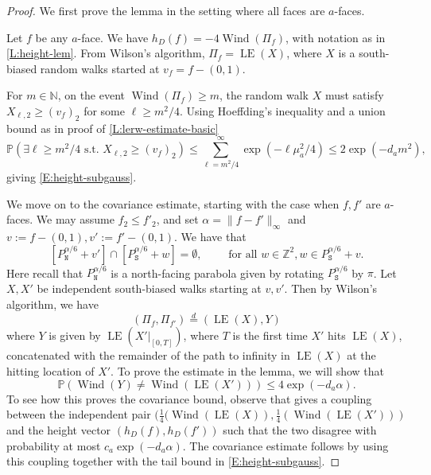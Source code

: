 \documentclass[11pt,twoside]{amsart}
\theoremstyle{plain}
\numberwithin{quest}{section}
\theoremstyle{remark}
\numberwithin{rem}{section}
\theoremstyle{definition}
\newcommand{\Z}{\mathbb{Z}}
\newcommand{\N}{\mathbb{N}}
\renewcommand{\P}{\mathbb{P}}
\renewcommand{\tt}[1]{{\mathtt{#1}}}
\begin{document}
	\begin{proof}
		We first prove the lemma in the setting where all faces are $a$-faces.
		
		Let $f$ be any $a$-face. We have $h_D(f) = - 4 \operatorname{Wind}(\Pi_f)$, with notation as in \cref{L:height-lem}. From Wilson's algorithm, $\Pi_f = \operatorname{LE}(X)$, where $X$ is a south-biased random walks started at $v_f = f - (0, 1)$.
		
		For $m \in \N$, on the event $\operatorname{Wind}(\Pi_f) \ge m$, the random walk $X$ must satisfy $X_{\ell, 2} \ge (v_f)_2$ for some $\ell \ge m^2/4$. Using Hoeffding's inequality and a union bound as in proof of \cref{L:lerw-estimate-basic}
		$$
		\P(\exists \ell \ge m^2/4 \text{ s.t. } X_{\ell, 2} \ge (v_f)_2) \le \sum_{\ell = m^2/4}^\infty \exp(-\ell \mu_a^2/4) \le 2 \exp(- d_a m^2),
		$$ 
		giving \eqref{E:height-subgauss}.
		
		We move on to the covariance estimate, starting with the case when $f, f'$ are $a$-faces. We may assume $f_2 \le f'_2$, and set $\alpha = \|f - f'\|_\infty$ and $v := f - (0, 1), v' := f' - (0, 1)$. We have that
		\begin{equation}
			\label{E:parab-bd}
			[P^{\alpha/6}_\tt{N} + v'] \cap [P^{\alpha/6}_\tt{S} + w] = \emptyset, \qquad \text{ for all } w \in \Z^2, w \in P^{\alpha/6}_\tt{S} + v.
		\end{equation}
		Here recall that $P^{\alpha/6}_\tt{N}$ is a north-facing parabola given by rotating $P^{\alpha/6}_\tt{S}$ by $\pi$.
		Let $X, X'$ be independent south-biased walks starting at $v, v'$. Then by Wilson's algorithm, we have $$
		(\Pi_f, \Pi_{f'}) \stackrel{d}{=} (\operatorname{LE}(X), Y)
		$$
		where $Y$ is given by $\operatorname{LE}(X'|_{[0, T]})$, where $T$ is the first time $X'$ hits $\operatorname{LE}(X)$, concatenated with the remainder of the path to infinity in  $\operatorname{LE}(X)$ at the hitting location of $X'$. To prove the estimate in the lemma, we will show that
		\begin{equation}
			\label{E:winding-estimate}
			\P(\operatorname{Wind}(Y) \ne \operatorname{Wind}(\operatorname{LE}(X'))) \le 4 \exp(-d_a \alpha).
		\end{equation}
		To see how this proves the covariance bound, observe that gives a coupling between the independent pair $(\frac{1}{4} (\operatorname{Wind}(\operatorname{LE}(X)), \frac{1}{4} (\operatorname{Wind}(\operatorname{LE}(X')))$ and the height vector $(h_D(f), h_D(f'))$ 
		such that the two disagree with probability at most $c_a\exp(-d_a \alpha)$. The covariance estimate follows by using this coupling together with the tail bound in \eqref{E:height-subgauss}.
		

\end{proof}
\end{document}
